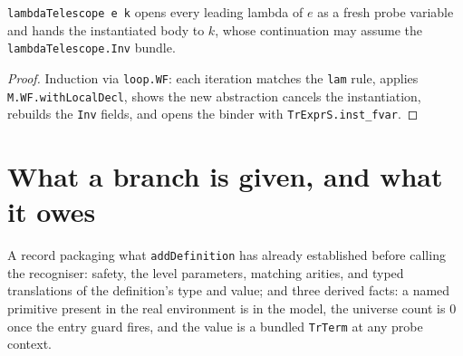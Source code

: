 \begin{theorem}
\label{vpc:thm:lambdatelescope-wf}
\leanok
{}

 \texttt{lambdaTelescope e k} opens every leading lambda of $e$ as a fresh probe
variable and hands the instantiated body to $k$, whose continuation may assume the
\texttt{lambdaTelescope.Inv} bundle.
\end{theorem}
\begin{proof}\leanok
{}
 Induction via \texttt{loop.WF}: each iteration matches the \texttt{lam} rule, applies
\texttt{M.WF.withLocalDecl}, shows the new abstraction cancels the instantiation, rebuilds the
\texttt{Inv} fields, and opens the binder with \texttt{TrExprS.inst\_fvar}.
\end{proof}

\section{What a branch is given, and what it owes}

\begin{definition}
\label{vpc:struct:primitive-data}
\leanok
{}

 A record packaging what \texttt{addDefinition} has already established before
calling the recogniser: safety, the level parameters, matching arities, and typed translations of
the definition's type and value; and three derived facts: a named primitive present in the real
environment is in the model, the universe count is $0$ once the entry guard fires, and the value
is a bundled \texttt{TrTerm} at any probe context.
\end{definition}

